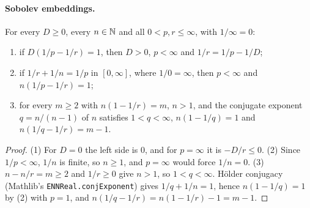 \paragraph{Sobolev embeddings.}

\begin{lemma}[Exponents]
\label{lem:gns-exponents}
\leanok
{}
For every $D \geq 0$, every $n \in \mathbb{N}$ and all $0 < p, r \leq \infty$, with $1/\infty = 0$:
\begin{enumerate}
  \item if $D(1/p - 1/r) = 1$, then $D > 0$, $p < \infty$ and $1/r = 1/p - 1/D$;
  \item if $1/r + 1/n = 1/p$ in $[0, \infty]$, where $1/0 = \infty$, then
    $p < \infty$ and $n(1/p - 1/r) = 1$;
  \item for every $m \geq 2$ with $n(1 - 1/r) = m$, $n > 1$, and the conjugate exponent
    $q = n/(n - 1)$ of $n$ satisfies $1 < q < \infty$, $n(1 - 1/q) = 1$ and
    $n(1/q - 1/r) = m - 1$.
\end{enumerate}
\end{lemma}

\begin{proof}
\leanok
(1) For $D = 0$ the left side is $0$, and for $p = \infty$ it is $-D/r \leq 0$. (2) Since
$1/p < \infty$, $1/n$ is finite, so $n \geq 1$, and $p = \infty$ would force $1/n = 0$.
(3) $n - n/r = m \geq 2$ and $1/r \geq 0$ give $n > 1$, so $1 < q < \infty$.
Hölder conjugacy (Mathlib's \texttt{ENNReal.\allowbreak conjExponent}) gives $1/q + 1/n = 1$,
hence $n(1 - 1/q) = 1$ by (2) with $p = 1$, and $n(1/q - 1/r) = n(1 - 1/r) - 1 = m - 1$.
\end{proof}

